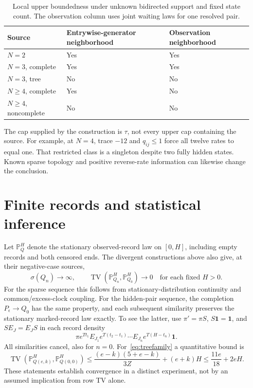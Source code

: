 \documentclass[aps,pre,onecolumn,11pt,longbibliography,notitlepage]{revtex4-2}
\newcommand{\1}{\mathbf 1}
\newcommand{\TV}{\operatorname{TV}}
\newcommand{\sig}{\sigma}
\begin{document}
\begin{table}[t]
\caption{Local upper boundedness under unknown bidirected support and fixed state count. The observation column uses joint waiting laws for one resolved pair.}\label{tab:criterion}
\begin{ruledtabular}
\begin{tabular}{lll}
Source & Entrywise-generator neighborhood & Observation neighborhood\\
\hline
$N=2$ & Yes & Yes\\
$N=3$, complete & Yes & Yes\\
$N=3$, tree & No & No\\
$N\ge4$, complete & Yes & No\\
$N\ge4$, noncomplete & No & No
\end{tabular}
\end{ruledtabular}
\end{table}

The cap supplied by the construction is $\tau$, not every upper cap containing the source. For example, at $N=4$, trace $-12$ and $q_{ij}\le1$ force all twelve rates to equal one. That restricted class is a singleton despite two fully hidden states. Known sparse topology and positive reverse-rate information can likewise change the conclusion.

\section{Finite records and statistical inference}\label{sec:records}
Let $\mathbb P_{Q}^{H}$ denote the stationary observed-record law on $[0,H]$, including empty records and both censored ends. The divergent constructions above also give, at their negative-case sources,
\begin{equation}
 \sig(Q_n)\to\infty,\qquad\TV(\mathbb P_{Q_n}^{H},\mathbb P_{Q_0}^{H})\to0
 \quad\text{for each fixed }H>0.\label{eq:window}
\end{equation}
For the sparse sequence this follows from stationary-distribution continuity and common/excess-clock coupling. For the hidden-pair sequence, the completion $P_\epsilon\to Q_0$ has the same property, and each subsequent similarity preserves the stationary marked-record law exactly. To see the latter, use $\pi'=\pi S$, $S\1=\1$, and $SE_J=E_JS$ in each record density
\begin{equation}
 \pi e^{Tt_1}E_{J_1}e^{T(t_2-t_1)}\cdots E_{J_n}e^{T(H-t_n)}\1.\label{eq:likelihood}
\end{equation}
All similarities cancel, also for $n=0$. For~\eqref{eq:treefamily} a quantitative bound is
\begin{equation}
 \TV(\mathbb P_{Q(e,k)}^{H},\mathbb P_{Q(0,0)}^{H})
 \le\frac{(e-k)(5+e-k)}{3Z}+(e+k)H
 \le\frac{11e}{18}+2eH.\label{eq:windowtree}
\end{equation}
These statements establish convergence in a distinct experiment, not by an assumed implication from row TV alone.
\end{document}
